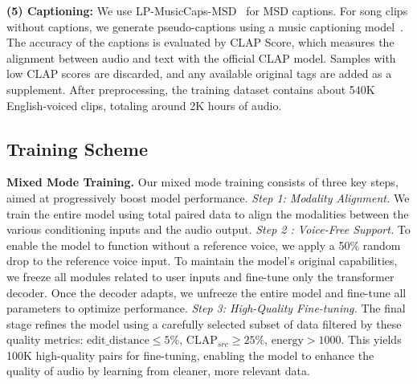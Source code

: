 \textbf{(5) Captioning:} 
We use LP-MusicCaps-MSD~\cite{doh2023lp} for MSD captions. For song clips without captions, we generate pseudo-captions using a music captioning model~\citep{doh2023lp}. The accuracy of the captions is evaluated by CLAP Score, which measures the alignment between audio and text with the official CLAP\cite{laionclap2023} model. Samples with low CLAP scores are discarded, and any available original tags are added as a supplement.
After preprocessing, the training dataset contains about 540K English-voiced clips, totaling around 2K hours of audio.






\subsection{Training Scheme}
\label{sec:train}
\textbf{Mixed Mode Training. }
Our mixed mode training consists of three key steps, aimed at progressively boost model performance. \textit{Step 1: Modality Alignment.} We train the entire model using total paired data to align the modalities between the various conditioning inputs and the audio output. 
\textit{Step 2 : Voice-Free Support.} 
To enable the model to function without a reference voice, we apply a 50\% random drop to the reference voice input. To maintain the model's original capabilities, we freeze all modules related to user inputs and fine-tune only the transformer decoder. Once the decoder adapts, we unfreeze the entire model and fine-tune all parameters to optimize performance.
\textit{Step 3: High-Quality Fine-tuning.} The final stage refines the model using a carefully selected subset of data filtered by these quality metrics: $\text{edit\_distance} \leq 5\%$, $\text{CLAP}_{src} \geq 25\%$, $\text{energy} > 1000$. This yields 100K high-quality pairs for fine-tuning, enabling the model to enhance the quality of audio by learning from cleaner, more relevant data. %

